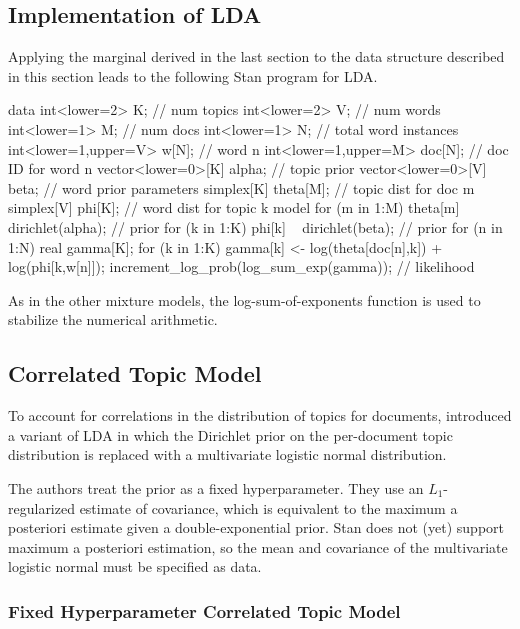 \subsection{Implementation of LDA}


Applying the marginal derived in the last section to the data
structure described in this section leads to the following Stan
program for LDA.
%
\begin{stancode}
data {
  int<lower=2> K;               // num topics
  int<lower=2> V;               // num words
  int<lower=1> M;               // num docs
  int<lower=1> N;               // total word instances
  int<lower=1,upper=V> w[N];    // word n
  int<lower=1,upper=M> doc[N];  // doc ID for word n
  vector<lower=0>[K] alpha;     // topic prior
  vector<lower=0>[V] beta;      // word prior
}
parameters {
  simplex[K] theta[M];   // topic dist for doc m
  simplex[V] phi[K];     // word dist for topic k
}
model {
  for (m in 1:M)  
    theta[m] ~ dirichlet(alpha);  // prior
  for (k in 1:K)  
    phi[k] ~ dirichlet(beta);     // prior
  for (n in 1:N) {
    real gamma[K];
    for (k in 1:K) 
      gamma[k] <- log(theta[doc[n],k]) + log(phi[k,w[n]]);
    increment_log_prob(log_sum_exp(gamma));  // likelihood
  }
}
\end{stancode}
%
As in the other mixture models, the log-sum-of-exponents function is
used to stabilize the numerical arithmetic. 

\subsection{Correlated Topic Model}

To account for correlations in the distribution of topics for
documents, \citep{BleiLafferty:2007} introduced a variant of LDA in
which the Dirichlet prior on the per-document topic distribution is
replaced with a multivariate logistic normal distribution.  

The authors treat the prior as a fixed hyperparameter.  They use an
$L_1$-regularized estimate of covariance, which is equivalent to the
maximum a posteriori estimate given a double-exponential prior.  Stan
does not (yet) support maximum a posteriori estimation, so the mean and
covariance of the multivariate logistic normal must be specified as
data.

\subsubsection{Fixed Hyperparameter Correlated Topic Model}

